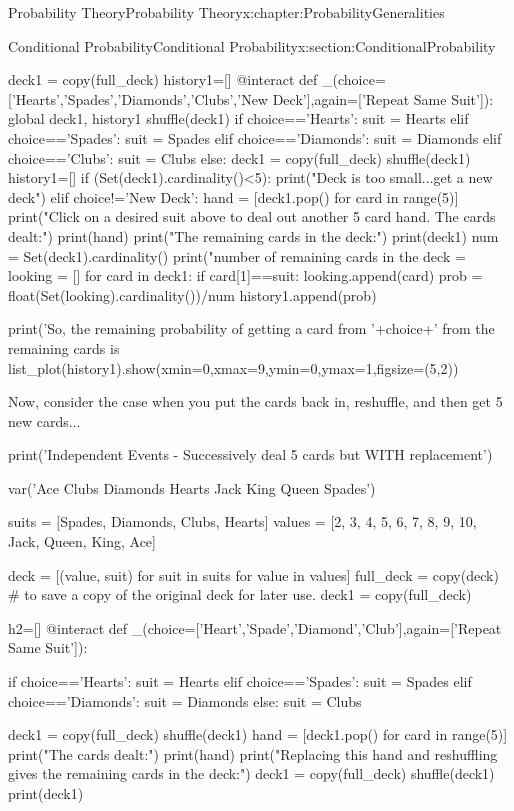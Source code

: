\documentclass[oneside,10pt,]{book}
\numberwithin{equation}{section}
\begin{document}
\begin{chapterptx}{Probability Theory}{}{Probability Theory}{}{}{x:chapter:ProbabilityGeneralities}
\begin{sectionptx}{Conditional Probability}{}{Conditional Probability}{}{}{x:section:ConditionalProbability}
\begin{sageinput}
deck1 = copy(full_deck)
history1=[]
@interact
def _(choice=['Hearts','Spades','Diamonds','Clubs','New Deck'],again=['Repeat Same Suit']):
    global deck1, history1
    shuffle(deck1)
    if choice=='Hearts':
        suit = Hearts
    elif choice=='Spades':
        suit = Spades
    elif choice=='Diamonds':
        suit = Diamonds
    elif choice=='Clubs':
        suit = Clubs
    else:
        deck1 = copy(full_deck)
        shuffle(deck1)
        history1=[]
    if (Set(deck1).cardinality()<5):
        print("Deck is too small...get a new deck")
    elif choice!='New Deck':
        hand = [deck1.pop() for card in range(5)] 
        print("Click on a desired suit above to deal out another 5 card hand.  The cards dealt:")
        print(hand)
        print("The remaining cards in the deck:")
        print(deck1)
        num = Set(deck1).cardinality()
        print("\nThe number of remaining cards in the deck = %
        looking = []
        for card in deck1:
            if card[1]==suit:
                looking.append(card)
        prob = float(Set(looking).cardinality())/num
        history1.append(prob)
        
        print('So, the remaining probability of getting a card from '+choice+' from the remaining cards is %
    list_plot(history1).show(xmin=0,xmax=9,ymin=0,ymax=1,figsize=(5,2))
\end{sageinput}
Now, consider the case when you put the cards back in, reshuffle, and then get 5 new cards...%
\begin{sageinput}
print('Independent Events - Successively deal 5 cards but WITH replacement')

var('Ace Clubs Diamonds Hearts Jack King Queen Spades') 

suits = [Spades, Diamonds, Clubs, Hearts] 
values = [2, 3, 4, 5, 6, 7, 8, 9, 10, Jack, Queen, King, Ace] 

deck = [(value, suit) for suit in suits for value in values]
full_deck = copy(deck)  # to save a copy of the original deck for later use.
deck1 = copy(full_deck)

h2=[]
@interact
def _(choice=['Heart','Spade','Diamond','Club'],again=['Repeat Same Suit']):

    if choice=='Hearts':
        suit = Hearts
    elif choice=='Spades':
        suit = Spades
    elif choice=='Diamonds':
        suit = Diamonds
    else:
        suit = Clubs

    deck1 = copy(full_deck)
    shuffle(deck1) 
    hand = [deck1.pop() for card in range(5)] 
    print("The cards dealt:")
    print(hand)
    print("Replacing this hand and reshuffling gives the remaining cards in the deck:")
    deck1 = copy(full_deck)
    shuffle(deck1)
    print(deck1)
    

\end{sageinput}
\end{sectionptx}
\end{chapterptx}
\end{document}
